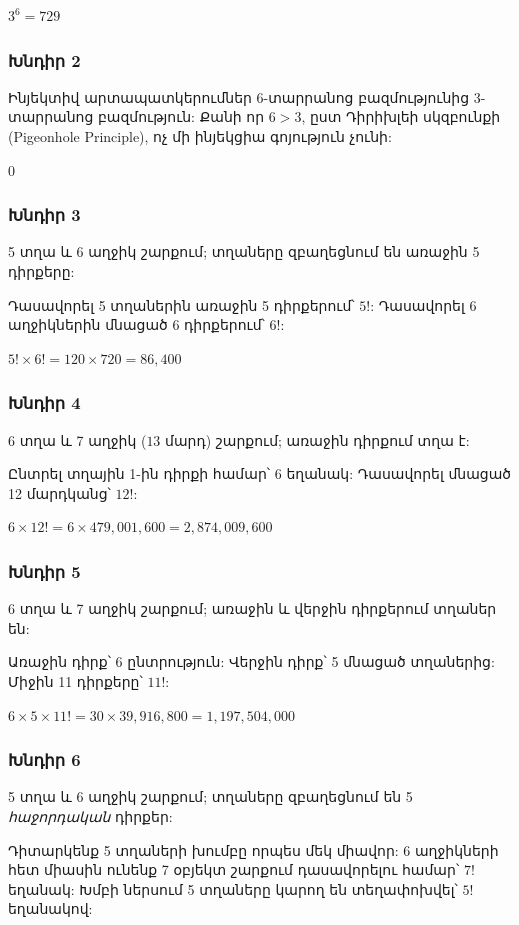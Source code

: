 $\boxed{3^6 = 729}$

\subsubsection*{Խնդիր 2}
Ինյեկտիվ արտապատկերումներ 6-տարրանոց բազմությունից 3-տարրանոց բազմություն:
Քանի որ $6 > 3$, ըստ Դիրիխլեի սկզբունքի (Pigeonhole Principle), ոչ մի ինյեկցիա գոյություն չունի:

$\boxed{0}$

\subsubsection*{Խնդիր 3}
5 տղա և 6 աղջիկ շարքում; տղաները զբաղեցնում են առաջին 5 դիրքերը:

Դասավորել 5 տղաներին առաջին 5 դիրքերում՝ $5!$:
Դասավորել 6 աղջիկներին մնացած 6 դիրքերում՝ $6!$:

$\boxed{5! \times 6! = 120 \times 720 = 86{,}400}$

\subsubsection*{Խնդիր 4}
6 տղա և 7 աղջիկ ($13$ մարդ) շարքում; առաջին դիրքում տղա է:

Ընտրել տղային 1-ին դիրքի համար՝ 6 եղանակ: Դասավորել մնացած 12 մարդկանց՝ $12!$:

$\boxed{6 \times 12! = 6 \times 479{,}001{,}600 = 2{,}874{,}009{,}600}$

\subsubsection*{Խնդիր 5}
6 տղա և 7 աղջիկ շարքում; առաջին և վերջին դիրքերում տղաներ են:

Առաջին դիրք՝ 6 ընտրություն: Վերջին դիրք՝ 5 մնացած տղաներից: Միջին 11 դիրքերը՝ $11!$:

$\boxed{6 \times 5 \times 11! = 30 \times 39{,}916{,}800 = 1{,}197{,}504{,}000}$

\subsubsection*{Խնդիր 6}
5 տղա և 6 աղջիկ շարքում; տղաները զբաղեցնում են 5 \emph{հաջորդական} դիրքեր:

Դիտարկենք 5 տղաների խումբը որպես մեկ միավոր: 6 աղջիկների հետ միասին ունենք 7 օբյեկտ շարքում դասավորելու համար՝ $7!$ եղանակ: Խմբի ներսում 5 տղաները կարող են տեղափոխվել՝ $5!$ եղանակով:

